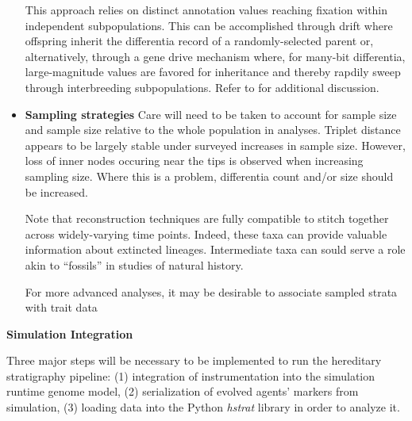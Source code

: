\begin{itemize}
  This approach relies on distinct annotation values reaching fixation within independent subpopulations.
  This can be accomplished through drift where offspring inherit the differentia record of a randomly-selected parent or, alternatively, through a gene drive mechanism where, for many-bit differentia, large-magnitude values are favored for inheritance and thereby rapdily sweep through interbreeding subpopulations. 
  Refer to \citep{moreno2024methods} for additional discussion.
\item \textbf{Sampling strategies}
Care will need to be taken to account for sample size and sample size relative to the whole population in analyses.
Triplet distance appears to be largely stable under surveyed increases in sample size.
However, loss of inner nodes occuring near the tips is observed when increasing sampling size.
Where this is a problem, differentia count and/or size should be increased.

Note that reconstruction techniques are fully compatible to stitch together across widely-varying time points.
Indeed, these taxa can provide valuable information about extincted lineages.
Intermediate taxa can sould serve a role akin to ``fossils'' in studies of natural history.

For more advanced analyses, it may be desirable to associate sampled strata with trait data \citep{TODOMODES,TODOCITEFROMJACOB}

\end{itemize}

\textbf{Simulation Integration}

Three major steps will be necessary to be implemented to run the hereditary stratigraphy pipeline: (1) integration of instrumentation into the simulation runtime genome model, (2) serialization of evolved agents' markers from simulation, (3) loading data into the Python \textit{hstrat} library in order to analyze it.

